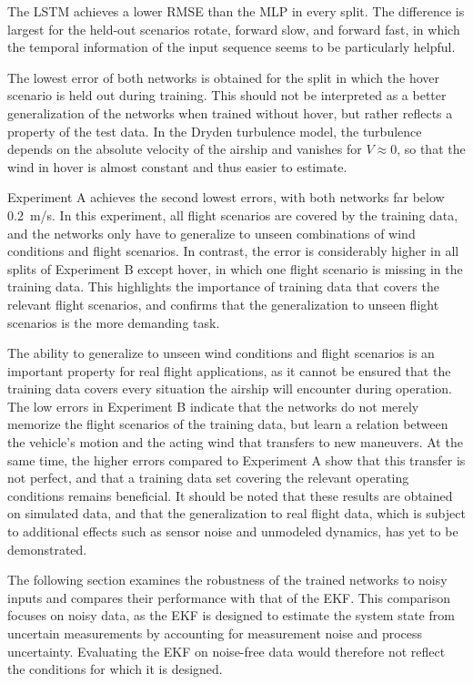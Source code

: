 The LSTM achieves a lower RMSE than the MLP in every split. The difference is largest for the held-out scenarios rotate, forward slow, and forward fast, in which the temporal information of the input sequence seems to be particularly helpful. 

The lowest error of both networks is obtained for the split in which the hover scenario is held out during training. This should not be interpreted as a better generalization of the networks when trained without hover, but rather reflects a property of the test data. In the Dryden turbulence model, the turbulence depends on the absolute velocity of the airship and vanishes for $V \approx 0$, so that the wind in hover is almost constant and thus easier to estimate. 

Experiment A achieves the second lowest errors, with both networks far below \SI{0.2}{m/s}. In this experiment, all flight scenarios are covered by the training data, and the networks only have to generalize to unseen combinations of wind conditions and flight scenarios. In contrast, the error is considerably higher in all splits of Experiment B except hover, in which one flight scenario is missing in the training data. This highlights the importance of training data that covers the relevant flight scenarios, and confirms that the generalization to unseen flight scenarios is the more demanding task.

The ability to generalize to unseen wind conditions and flight scenarios is an important property for real flight applications, as it cannot be ensured that the training data covers every situation the airship will encounter during operation. The low errors in Experiment B indicate that the networks do not merely memorize the flight scenarios of the training data, but learn a relation between the vehicle's motion and the acting wind that transfers to new maneuvers. At the same time, the higher errors compared to Experiment A show that this transfer is not perfect, and that a training data set covering the relevant operating conditions remains beneficial. It should be noted that these results are obtained on simulated data, and that the generalization to real flight data, which is subject to additional effects such as sensor noise and unmodeled dynamics, has yet to be demonstrated.

The following section examines the robustness of the trained networks to noisy inputs and compares their performance with that of the EKF. This comparison focuses on noisy data, as the EKF is designed to estimate the system state from uncertain measurements by accounting for measurement noise and process uncertainty. Evaluating the EKF on noise-free data would therefore not reflect the conditions for which it is designed.





